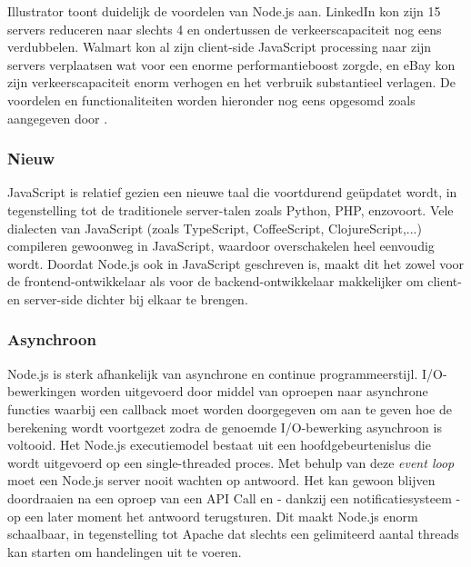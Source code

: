 Illustrator \textcite{Mehmet2016} toont duidelijk de voordelen van Node.js aan. LinkedIn kon zijn 15 servers reduceren naar slechts 4 en ondertussen de verkeerscapaciteit nog eens verdubbelen. Walmart kon al zijn client-side JavaScript processing naar zijn servers verplaatsen wat voor een enorme performantieboost zorgde, en eBay kon zijn verkeerscapaciteit enorm verhogen en het verbruik substantieel verlagen. De voordelen en functionaliteiten worden hieronder nog eens opgesomd zoals aangegeven door \textcite{Chandrayan2017}.

\subsubsection{Nieuw}
\label{sec:new}

JavaScript is relatief gezien een nieuwe taal die voortdurend geüpdatet wordt, in tegenstelling tot de traditionele server-talen zoals Python, PHP, enzovoort. Vele dialecten van JavaScript (zoals TypeScript, CoffeeScript, ClojureScript,...) compileren gewoonweg in JavaScript, waardoor overschakelen heel eenvoudig wordt. Doordat Node.js ook in JavaScript geschreven is, maakt dit het zowel voor de frontend-ontwikkelaar als voor de backend-ontwikkelaar makkelijker om client-en server-side dichter bij elkaar te brengen. \autocite{ExpressMozilla}

\subsubsection{Asynchroon}
\label{sec:async}

Node.js is sterk afhankelijk van asynchrone en continue programmeerstijl. I/O-bewerkingen worden uitgevoerd door middel van oproepen naar asynchrone functies waarbij een callback moet worden doorgegeven om aan te geven hoe de berekening wordt voortgezet zodra de genoemde I/O-bewerking asynchroon is voltooid. Het Node.js executiemodel bestaat uit een hoofdgebeurtenislus die wordt uitgevoerd op een single-threaded proces. Met behulp van deze \textit{event loop} moet een Node.js server nooit wachten op antwoord. Het kan gewoon blijven doordraaien na een oproep van een API Call en - dankzij een notificatiesysteem - op een later moment het antwoord terugsturen. Dit maakt Node.js enorm schaalbaar, in tegenstelling tot Apache dat slechts een gelimiteerd aantal threads kan starten om handelingen uit te voeren.


